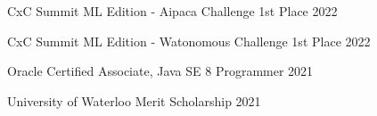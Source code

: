 CxC Summit ML Edition - Aipaca Challenge 1st Place \hfill 2022 \par
CxC Summit ML Edition - Watonomous Challenge 1st Place \hfill 2022 \par
Oracle Certified Associate, Java SE 8 Programmer \hfill 2021 \par
University of Waterloo Merit Scholarship \hfill 2021 \par
